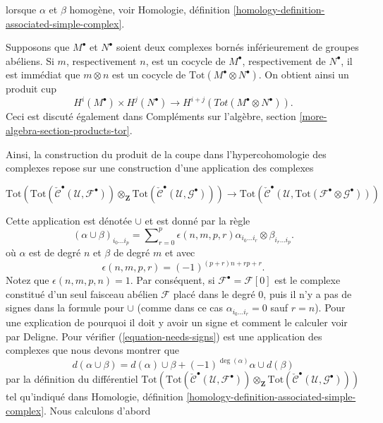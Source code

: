 lorsque $\alpha$ et $\beta$ homogène, voir Homologie, définition \ref{homology-definition-associated-simple-complex}.

\medskip\noindent
Supposons que $M^\bullet$ et $N^\bullet$ soient deux complexes bornés inférieurement de groupes abéliens. Si $m$, respectivement $n$, est un cocycle de $M^\bullet$, respectivement de $N^\bullet$, il est immédiat que $m \otimes n$ est un cocycle de $\text{Tot}(M^\bullet\otimes N^\bullet)$. On obtient ainsi un produit cup $$
H^i(M^\bullet) \times H^j(N^\bullet)
\longrightarrow
H^{i + j}(Tot(M^\bullet\otimes N^\bullet)).
$$ Ceci est discuté également dans Compléments sur l'algèbre, section \ref{more-algebra-section-products-tor}.

\medskip\noindent

Ainsi, la construction du produit de la coupe dans l'hypercohomologie des complexes repose sur une construction d'une application des complexes

\begin{equation}
\label{equation-needs-signs}
\text{Tot}\left(
\text{Tot}(\check{\mathcal{C}}^\bullet({\mathcal U}, {\mathcal F}^\bullet))
\otimes_{\mathbf Z}
\text{Tot}(\check{\mathcal{C}}^\bullet({\mathcal U}, {\mathcal G}^\bullet))
\right)
\longrightarrow
\text{Tot}(
\check{\mathcal{C}}^\bullet({\mathcal U},
\text{Tot}({\mathcal F}^\bullet\otimes {\mathcal G}^\bullet)
))
\end{equation}

Cette application est dénotée $\cup$ et est donné par la règle
$$
(\alpha \cup \beta)_{i_0 \ldots i_p}
=
\sum\nolimits_{r = 0}^p
\epsilon(n, m, p, r)
\alpha_{i_0 \ldots i_r} \otimes \beta_{i_r \ldots i_p}.
$$
où $\alpha$ est de degré $n$ et $\beta$ de degré $m$
et avec
$$
\epsilon(n, m, p, r) = (-1)^{(p + r)n + rp + r}.
$$
Notez que $\epsilon(n, m, p, n) = 1$. Par conséquent, si
$\mathcal{F}^\bullet = \mathcal{F}[0]$ est le complexe constitué d'un seul faisceau abélien $\mathcal{F}$ placé dans le degré $0$, puis il n'y a pas de signes dans la formule pour $\cup$ (comme dans ce cas
$\alpha_{i_0 \ldots i_r} = 0$ sauf $r = n$). Pour une explication de pourquoi il doit y avoir un signe et comment le calculer voir \cite[Exposé XVII]{SGA4} par Deligne. Pour vérifier (\ref{equation-needs-signs}) est une application des complexes que nous devons montrer que
$$
d(\alpha \cup \beta) =
d(\alpha) \cup \beta +
(-1)^{\deg(\alpha)} \alpha \cup d(\beta)
$$
par la définition du différentiel
$\text{Tot}(
\text{Tot}(\check{\mathcal{C}}^\bullet({\mathcal U}, {\mathcal F}^\bullet))
\otimes_{\mathbf Z}
\text{Tot}(\check{\mathcal{C}}^\bullet({\mathcal U}, {\mathcal G}^\bullet))
)$
tel qu'indiqué dans Homologie, définition \ref{homology-definition-associated-simple-complex}. Nous calculons d'abord

